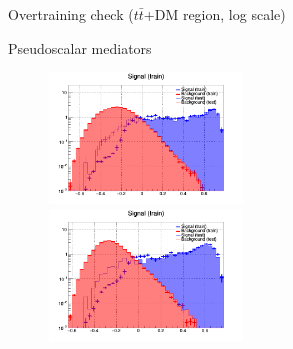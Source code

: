 \documentclass[8pt]{beamer}
\begin{document}
\begin{frame}{Overtraining check ($t \bar t$+DM region, log scale)}
\vspace{-5pt}
\begin{block}{\centering Pseudoscalar mediators}\end{block} \vspace{-10pt}
\begin{figure}[htbp]
\centering
\begin{minipage}[b]{.49\textwidth}
\begin{center}
\includegraphics[width=5.2cm, height=3.5cm]{figs/log_pseudo_overtraining_100GeV_TTbar.png}
\end{center}
\end{minipage}\hfill
\begin{minipage}[b]{.49\textwidth}
\begin{center}
\includegraphics[width=5.2cm, height=3.5cm]{figs/log_pseudo_overtraining_500GeV_TTbar.png}
\end{center}
\end{minipage} \hfill
\end{figure} \vfill
\end{frame}
\end{document}
